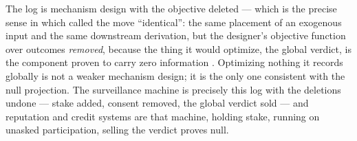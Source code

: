 \documentclass[../main]{subfiles}
\begin{document}
\begin{econ}[label=e:artifact, title={Mechanism design with the objective deleted},
  ref=pr:agg, cites={a:tadelis}, departs=scalar,
  stopsat={the designer's objective removed because the global verdict it would optimize carries zero information; reputation and credit are that machine re-armed}]
  The log is mechanism design \parencite{a:mechdesign} with the objective deleted --- which is
  the precise sense in which  called the move ``identical'': the same placement of
  an exogenous input and the same downstream derivation, but the designer's objective function
  over outcomes \emph{removed}, because the thing it would optimize, the global verdict, is the
  component proven to carry zero information . Optimizing nothing it records globally
  is not a weaker mechanism design; it is the only one consistent with the null projection. The
  surveillance machine is precisely this log with the deletions undone --- stake added, consent
  removed, the global verdict sold --- and reputation and credit systems \parencite{a:tadelis}
  are that machine, holding stake, running on unasked participation, selling the verdict 
  proves null.
\end{econ}
\end{document}
